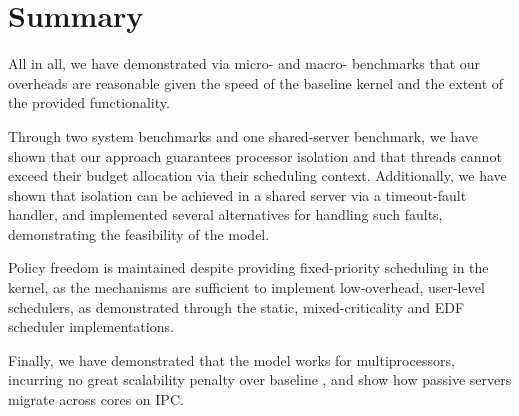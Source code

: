 \section{Summary}

All in all, we have demonstrated via micro- and macro- benchmarks that our overheads are
reasonable given the speed of the baseline kernel and the extent of the provided
functionality. 

Through two system benchmarks and one shared-server benchmark, we have shown
that our approach guarantees processor isolation and that threads cannot exceed
their budget allocation via their scheduling context. Additionally, we have
shown that isolation can be achieved in a shared server via a timeout-fault
handler, and implemented several alternatives for handling such faults,
demonstrating the feasibility of the model. 

Policy freedom is maintained despite providing fixed-priority scheduling in the kernel, as the
mechanisms are sufficient to implement low-overhead, user-level schedulers, 
as demonstrated through the static, mixed-criticality and EDF scheduler
implementations. 

Finally, we have demonstrated that the model works for multiprocessors,
incurring no great scalability penalty over baseline \selfour, 
and show how passive servers migrate across cores on \gls{IPC}.
